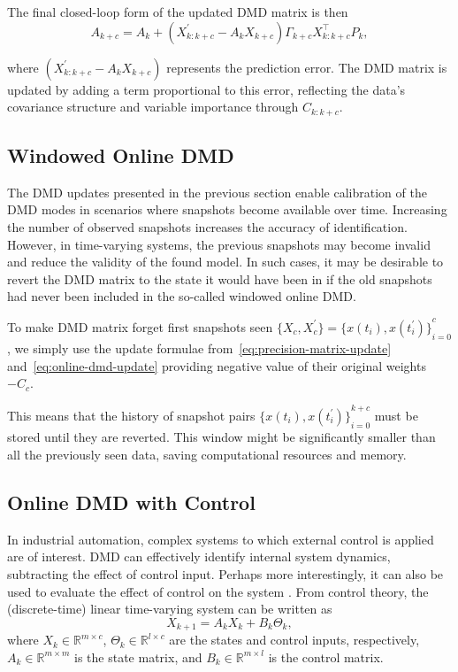 The final closed-loop form of the updated DMD matrix is then
\begin{equation}\label{eq:online-dmd-update}
    A_{k+c} = A_k + (X^\prime_{k : k+c} - A_k X_{k+c}) \Gamma_{k+c} X_{k : k+c}^\top P_k,
\end{equation}

where \((X^\prime_{k : k+c} - A_k X_{k+c})\) represents the prediction error. The DMD matrix is updated by adding a term proportional to this error, reflecting the data's covariance structure and variable importance through \(C_{k: k + c}\).

\subsection{Windowed Online DMD}
The DMD updates presented in the previous section enable calibration of the DMD modes in scenarios where snapshots become available over time. Increasing the number of observed snapshots increases the accuracy of identification. However, in time-varying systems, the previous snapshots may become invalid and reduce the validity of the found model. In such cases, it may be desirable to revert the DMD matrix to the state it would have been in if the old snapshots had never been included in the so-called windowed online DMD.

To make DMD matrix forget first snapshots seen \( \{X_{c}, X^\prime_{c}\} = {\{x(t_i), x(t_i^\prime )\}}^c_{i=0}\), we simply use the update formulae from~\eqref{eq:precision-matrix-update} and~\eqref{eq:online-dmd-update} providing negative value of their original weights \(-C_{c}\).

This means that the history of snapshot pairs \({\{x(t_i), x(t_i^\prime )\}}^{k+c}_{i=0}\) must be stored until they are reverted. This window might be significantly smaller than all the previously seen data, saving computational resources and memory.


\subsection{Online DMD with Control}
In industrial automation, complex systems to which external control is applied are of interest. DMD can effectively identify internal system dynamics, subtracting the effect of control input. Perhaps more interestingly, it can also be used to evaluate the effect of control on the system \citep{Proctor2016}. From control theory, the (discrete-time) linear time-varying system can be written as
\begin{equation}\label{eq:linear-system}
    X_{k+1} = A_k X_{k} + B_k \Theta_{k},
\end{equation}
where \(X_k \in \mathbb{R}^{m \times c}\), \(\Theta_k \in \mathbb{R}^{l \times c}\) are the states and control inputs, respectively, \(A_k \in \mathbb{R}^{m \times m}\) is the state matrix, and \(B_k \in \mathbb{R}^{m \times l}\) is the control matrix.


